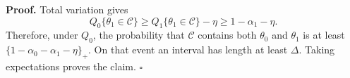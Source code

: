 \textbf{Proof.}
Total variation gives
\[
Q_0\{\theta_1\in\mathcal C\}
\ge Q_1\{\theta_1\in\mathcal C\}-\eta
\ge 1-\alpha_1-\eta.
\]
Therefore, under \(Q_0\), the probability that \(\mathcal C\) contains both \(\theta_0\) and \(\theta_1\) is at least \(\{1-\alpha_0-\alpha_1-\eta\}_+\). On that event an interval has length at least \(\Delta\). Taking expectations proves the claim. \(\square\)